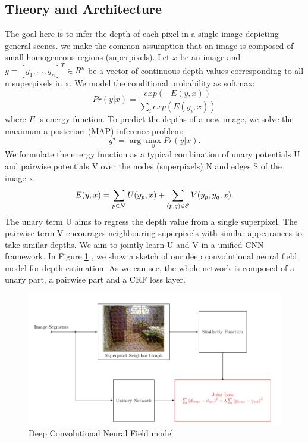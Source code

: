 \documentclass[10pt,twocolumn,letterpaper]{article}
\begin{document}
\subsection{Theory and Architecture}
The goal here is to infer the depth of each pixel in a single image depicting 
general scenes. we make the common assumption that an image is composed of small 
homogeneous regions (superpixels). 
Let $x$ be an image and $y=[y_1,...,y_n]^T\in R^n$ be a vector of continuous 
depth values corresponding to all n superpixels in x. We model the conditional 
probability as softmax:
\begin{equation}
Pr(y|x)=\frac{exp(-E(y,x))}{\sum_i 
exp(E(y_i,x))}
\end{equation}
where $E$ is energy function.
To predict the depths of a new image, we solve the maximum a posteriori (MAP) 
inference problem: 
\begin{equation}
 \label{eq:inference}
y^{\star}=\arg\max\limits_y Pr(y|x). 
\end{equation}
We formulate the energy function as a 
typical combination of unary potentials U and pairwise potentials V over the 
nodes (superpixels) N and edges S of the image x:
\begin{equation}\label{eq:energy}
E(y, x) = \sum_{p \in {\cal N} } U(y_{p}, x) 
	 + \sum_{(p,q) \in {\cal S}} V(y_{p}, y_{q}, x).
\end{equation}
The unary term U aims to regress the depth value from a single superpixel. The 
pairwise term V encourages neighbouring superpixels with similar appearances 
to take similar depths. We aim to jointly learn U and V in a unified CNN 
framework.
In Figure.\ref{fig:arch} , we show a sketch of our deep convolutional
neural field model for depth estimation. As we can see, the whole network is 
composed of a unary part, a pairwise part and a CRF loss layer.
\begin{figure}
\includegraphics[width=.9\linewidth]{../presentation/arch.png}
\caption{Deep Convolutional Neural Field model}
\label{fig:arch}
\end{figure}
\end{document}
